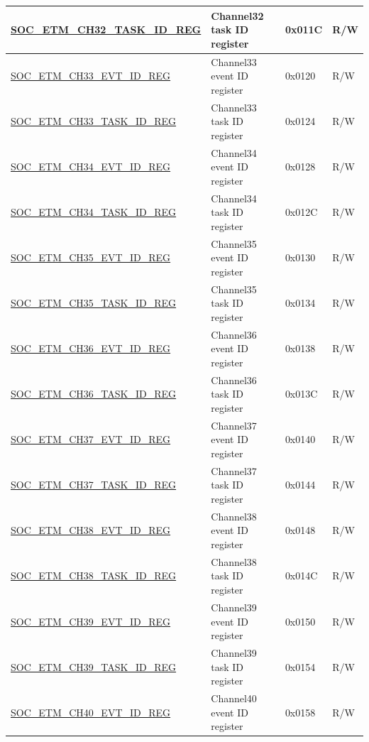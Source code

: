 \begin{longtable}{ | p{6cm} | p{6.2cm} | p{1.3cm} | p{2cm} | }
\hyperref[regdesc:SOCETMCHNTASKIDREG]{SOC\_ETM\_CH32\_TASK\_ID\_REG} & Channel32 task ID register & 0x011C & R/W \\ \hline
\hyperref[regdesc:SOCETMCHNEVTIDREG]{SOC\_ETM\_CH33\_EVT\_ID\_REG} & Channel33 event ID register & 0x0120 & R/W \\ \hline
\hyperref[regdesc:SOCETMCHNTASKIDREG]{SOC\_ETM\_CH33\_TASK\_ID\_REG} & Channel33 task ID register & 0x0124 & R/W \\ \hline
\hyperref[regdesc:SOCETMCHNEVTIDREG]{SOC\_ETM\_CH34\_EVT\_ID\_REG} & Channel34 event ID register & 0x0128 & R/W \\ \hline
\hyperref[regdesc:SOCETMCHNTASKIDREG]{SOC\_ETM\_CH34\_TASK\_ID\_REG} & Channel34 task ID register & 0x012C & R/W \\ \hline
\hyperref[regdesc:SOCETMCHNEVTIDREG]{SOC\_ETM\_CH35\_EVT\_ID\_REG} & Channel35 event ID register & 0x0130 & R/W \\ \hline
\hyperref[regdesc:SOCETMCHNTASKIDREG]{SOC\_ETM\_CH35\_TASK\_ID\_REG} & Channel35 task ID register & 0x0134 & R/W \\ \hline
\hyperref[regdesc:SOCETMCHNEVTIDREG]{SOC\_ETM\_CH36\_EVT\_ID\_REG} & Channel36 event ID register & 0x0138 & R/W \\ \hline
\hyperref[regdesc:SOCETMCHNTASKIDREG]{SOC\_ETM\_CH36\_TASK\_ID\_REG} & Channel36 task ID register & 0x013C & R/W \\ \hline
\hyperref[regdesc:SOCETMCHNEVTIDREG]{SOC\_ETM\_CH37\_EVT\_ID\_REG} & Channel37 event ID register & 0x0140 & R/W \\ \hline
\hyperref[regdesc:SOCETMCHNTASKIDREG]{SOC\_ETM\_CH37\_TASK\_ID\_REG} & Channel37 task ID register & 0x0144 & R/W \\ \hline
\hyperref[regdesc:SOCETMCHNEVTIDREG]{SOC\_ETM\_CH38\_EVT\_ID\_REG} & Channel38 event ID register & 0x0148 & R/W \\ \hline
\hyperref[regdesc:SOCETMCHNTASKIDREG]{SOC\_ETM\_CH38\_TASK\_ID\_REG} & Channel38 task ID register & 0x014C & R/W \\ \hline
\hyperref[regdesc:SOCETMCHNEVTIDREG]{SOC\_ETM\_CH39\_EVT\_ID\_REG} & Channel39 event ID register & 0x0150 & R/W \\ \hline
\hyperref[regdesc:SOCETMCHNTASKIDREG]{SOC\_ETM\_CH39\_TASK\_ID\_REG} & Channel39 task ID register & 0x0154 & R/W \\ \hline
\hyperref[regdesc:SOCETMCHNEVTIDREG]{SOC\_ETM\_CH40\_EVT\_ID\_REG} & Channel40 event ID register & 0x0158 & R/W \\ \hline

\end{longtable}
